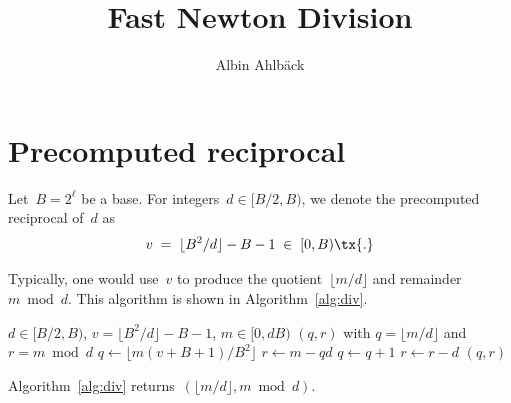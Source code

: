 \documentclass[12pt,oneside,draft]{scrartcl}
\title{Fast Newton Division}
\author{Albin Ahlbäck\footnotemark[1]}
\begin{document}
\thispagestyle{scrplain}%
\maketitle



\def\contentsname{}%
\tableofcontents
\vspace*{1.5em}


\section{Precomputed reciprocal}

Let~$B = 2^{\ell}$ be a base.  For integers~$d \in [B / 2, B)$, we denote the precomputed reciprocal of~$d$ as
\begin{gather}
  v
\;=\;
  \lfloor B^{2} / d \rfloor - B - 1
\;\in\;
  [0, B)
\tx{.}
\label{eq:reciprocal}
\end{gather}

Typically, one would use~$v$ to produce the quotient~$\lfloor m / d \rfloor$ and remainder~$m \bmod d$.  This algorithm is shown in Algorithm~\ref{alg:div}.
\begin{algorithm}
\caption{Division of~$m$ by~$d$ with precomputed reciprocal~$v$}
\label{alg:div}
\begin{algorithmic}[1]
\Require $d \in [B / 2, B)$,\; $v = \lfloor B^{2} / d \rfloor - B - 1$,\; $m \in [0, d B)$
\Ensure $(q, r)$ with $q = \lfloor m / d \rfloor$ and $r = m \bmod d$
\State $q \gets \bigl\lfloor m (v + B + 1) / B^{2} \bigr\rfloor$
\State $r \gets m - q d$
  \State $q \gets q + 1$
  \State $r \gets r - d$
\EndIf
\State \Return $(q, r)$
\end{algorithmic}
\end{algorithm}

\begin{proposition}
\label{prop:div_correct}
Algorithm~\ref{alg:div} returns~$(\lfloor m / d \rfloor, m \bmod d)$.
\end{proposition}
\end{document}
